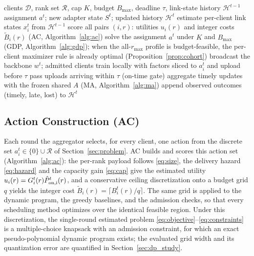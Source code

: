 \documentclass[a4paper,fleqn]{cas-dc}
\begin{document}
\begin{algorithm}[t]
\caption{FedRAS Round}
\label{alg:fedras}
\begin{algorithmic}[1]
\REQUIRE clients $\mathcal D$, rank set $\mathcal R$, cap $K$, budget $B_{\max}$, deadline $\tau$, link-state history $\mathcal H^{t-1}$
\ENSURE assignment $a^t$; new adapter state $S^t$; updated history $\mathcal H^t$
\STATE estimate per-client link states $x_i^t$ from $\mathcal H^{t-1}$
\STATE score all pairs $(i,r)$: utilities $u_i(r)$ and integer costs $\widetilde B_i(r)$ (AC, Algorithm~\ref{alg:ac})
\STATE solve the assignment $a^t$ under $K$ and $B_{\max}$ (GDP, Algorithm~\ref{alg:gdp}); when the all-$r_{\max}$ profile is budget-feasible, the per-client maximizer rule is already optimal (Proposition~\ref{prop:cohort})
\STATE broadcast the backbone $w^t$; admitted clients train locally with factors sliced to $a_i^t$ and upload before $\tau$
\STATE pass uploads arriving within $\tau$ (on-time gate)
\STATE aggregate timely updates with the frozen shared $A$ (MA, Algorithm~\ref{alg:ma})
\STATE append observed outcomes (timely, late, lost) to $\mathcal H^t$
\end{algorithmic}
\end{algorithm}

\subsection{Action Construction (AC)}
\label{sec:ac}
Each round the aggregator selects, for every client, one action from the discrete set $a_i^t\in\{0\}\cup\mathcal R$ of Section~\ref{sec:problem}. AC builds and scores this action set (Algorithm~\ref{alg:ac}): the per-rank payload follows \eqref{eq:size}, the delivery hazard \eqref{eq:hazard} and the capacity gain \eqref{eq:cap} give the estimated utility $u_i(r)=G_i^t(r)\hat P_{\rm on,i}^t(r)$, and a conservative ceiling discretization onto a budget grid $q$ yields the integer cost $\widetilde B_i(r)=\lceil B_i^t(r)/q\rceil$. The same grid is applied to the dynamic program, the greedy baselines, and the admission checks, so that every scheduling method optimizes over the identical feasible region. Under this discretization, the single-round estimated problem \eqref{eq:objective}--\eqref{eq:constraints} is a multiple-choice knapsack with an admission constraint, for which an exact pseudo-polynomial dynamic program exists; the evaluated grid width and its quantization error are quantified in Section~\ref{sec:dp_study}.
\end{document}
